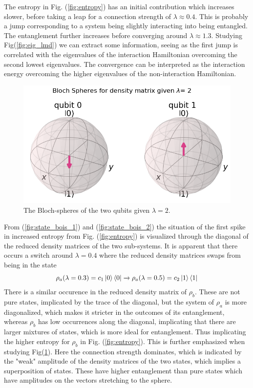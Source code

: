 The entropy in Fig. (\ref{fig:entropy}) has an initial contribution which increases slower, before taking a leap for a connection strength of $\lambda \approx 0.4$. This is probably a jump corresponding to a system being slightly interacting into being entangled. The entanglement further increases before converging around $\lambda \approx 1.3$. Studying Fig(\ref{fig:eig_lmd}) we can extract some information, seeing as the first jump is correlated with the eigenvalues of the interaction Hamiltonian overcoming the second lowest eigenvalues. The convergence can be interpreted as the interaction energy overcoming the higher eigenvalues of the non-interaction Hamiltonian.
\newline\newline
\begin{figure}
    \centering
    \includegraphics[width=\linewidth]{figs/bloch_entropy_lmd_2.PNG}
    \caption{The Bloch-spheres of the two qubits given $\lambda = 2$. }
    \label{fig:bloch_entropy}
\end{figure}
From  (\cref{fig:state_bois_1}) and (\cref{fig:state_bois_2}) the situation of the first spike in increased entropy from Fig. (\ref{fig:entropy}) is visualized through the diagonal of the reduced density matrices of the two sub-systems. It is apparent that there occurs a switch around $\lambda = 0.4$ where the reduced density matrices swaps from being in the state $$\rho_a(\lambda = 0.3) = c_1 \ket{0}\bra{0} \xrightarrow{} \rho_a(\lambda = 0.5) = c_2 \ket{1}\bra{1}$$
There is a similar occurence in the reduced density matrix  of $\rho_b$. These are not pure states, implicated by the trace of the diagonal, but the system of $\rho_a$ is more diagonalized, which makes it stricter in the outcomes of its entanglement, whereas $\rho_b$ has low occurrences along the diagonal, implicating that there are larger mixtures of states, which is more ideal for entanglement. Thus implicating the higher entropy for $\rho_b$ in Fig. (\ref{fig:entropy}). This is further emphasized when studying Fig(\ref{fig:bloch_entropy}). Here the connection strength dominates, which is indicated by the "weak" amplitude of the density matrices of the two states, which implies a superposition of states. These have higher entanglement than pure states which have amplitudes on the vectors stretching to the sphere. \newline\newline


